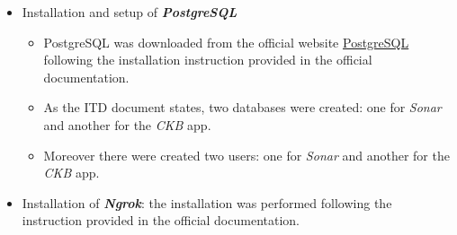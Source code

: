 \begin{itemize}
\begin{itemize}
        \end{itemize}
        \item Installation and setup of \textbf{\textit{PostgreSQL}}
        \begin{itemize}
            \item PostgreSQL was downloaded from the official website \href{https://www.postgresql.org/download/}{PostgreSQL} following the installation instruction provided in the official documentation.
            \item As the ITD document states, two databases were created: one for \textit{Sonar} and another for the \textit{CKB} app.
            \item Moreover there were created two users: one for \textit{Sonar} and another for the \textit{CKB} app.
        \end{itemize}
        \item Installation of \textbf{\textit{Ngrok}}: the installation was performed following the instruction provided in the official documentation.
\end{itemize}
